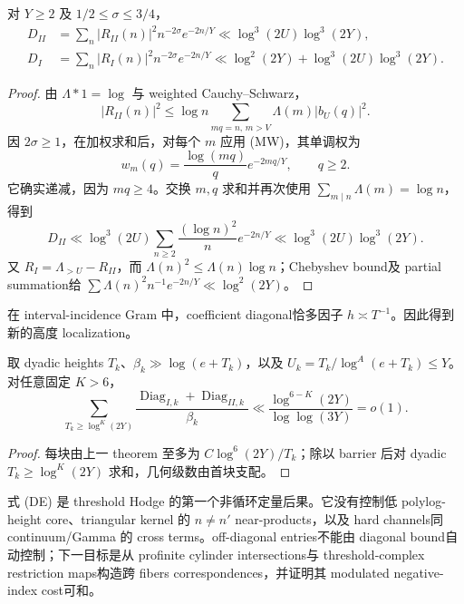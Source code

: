 \begin{theorem}
对 $Y\geq2$ 及 $1/2\leq\sigma\leq3/4$，
\begin{align*}
 D_{II}&=\sum_n|R_{II}(n)|^2n^{-2\sigma}e^{-2n/Y}
 \ll\log^3(2U)\log^3(2Y),\\
 D_I&=\sum_n|R_I(n)|^2n^{-2\sigma}e^{-2n/Y}
 \ll\log^2(2Y)+\log^3(2U)\log^3(2Y).
\end{align*}
\end{theorem}

\begin{proof}
由 $\Lambda*1=\log$ 与 weighted Cauchy--Schwarz，
\[
 |R_{II}(n)|^2\leq \log n
 \sum_{mq=n,\,m>V}\Lambda(m)|b_U(q)|^2.          \tag{CD}
\]
因 $2\sigma\geq1$，在加权求和后，对每个 $m$ 应用 (MW)，其单调权为
\[
 w_m(q)=\frac{\log(mq)}q e^{-2mq/Y},\qquad q\geq2.
\]
它确实递减，因为 $mq\geq4$。交换 $m,q$ 求和并再次使用
$\sum_{m\mid n}\Lambda(m)=\log n$，得到
\[
 D_{II}\ll\log^3(2U)
 \sum_{n\geq2}\frac{(\log n)^2}{n}e^{-2n/Y}
 \ll\log^3(2U)\log^3(2Y).
\]
又 $R_I=\Lambda_{>U}-R_{II}$，而
$\Lambda(n)^2\leq\Lambda(n)\log n$；Chebyshev bound及 partial summation给
$\sum\Lambda(n)^2n^{-1}e^{-2n/Y}\ll\log^2(2Y)$。
\end{proof}

在 interval-incidence Gram 中，coefficient diagonal恰多因子
$h\asymp T^{-1}$。因此得到新的高度 localization。

\begin{corollary}
取 dyadic heights $T_k$、$\beta_k\gg\log(e+T_k)$，以及
$U_k=T_k/\log^A(e+T_k)\leq Y$。对任意固定 $K>6$，
\[
 \sum_{T_k\geq\log^K(2Y)}
 \frac{\operatorname{Diag}_{I,k}+\operatorname{Diag}_{II,k}}{\beta_k}
 \ll\frac{\log^{6-K}(2Y)}{\log\log(3Y)}=o(1).   \tag{DE}
\]
\end{corollary}

\begin{proof}
每块由上一 theorem 至多为 $C\log^6(2Y)/T_k$；除以 barrier 后对 dyadic
$T_k\geq\log^K(2Y)$ 求和，几何级数由首块支配。
\end{proof}

式 (DE) 是 threshold Hodge 的第一个非循环定量后果。它没有控制低
polylog-height core、triangular kernel 的 $n\neq n'$ near-products，以及 hard
channels同 continuum/Gamma 的 cross terms。off-diagonal entries不能由 diagonal
bound自动控制；下一目标是从 profinite cylinder intersections与 threshold-complex
restriction maps构造跨 fibers correspondences，并证明其 modulated negative-index
cost可和。
